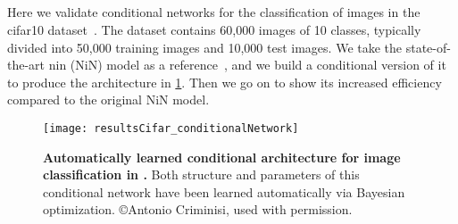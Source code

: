 \documentclass[thesis]{subfiles}
\begin{document}
	
	\subsection{}
	Here we validate conditional networks for the classification of images in the \gls{cifar10} dataset~\citep{CIFAR10}. 
	The dataset contains 60,000 images of 10 classes, typically divided into 50,000 training images and 10,000 test images. 
	We take the state-of-the-art \gls{nin} (NiN) model 
	as a reference~\citep{Lin2013NiN}, and we build a conditional version of it to produce the architecture in \cref{fig:Cifar_CondNet}. 
	Then we go on to show its increased efficiency compared to the original NiN model.
	
	\begin{figure}[tbp]
		\centerline{
			\texttt{[image: resultsCifar\_conditionalNetwork]}
		}
		\caption[Automatically-learned conditional architecture for ]{\textbf{Automatically learned conditional architecture for image classification in .} Both structure and parameters of this conditional network have been learned automatically via Bayesian optimization. \copyright Antonio Criminisi, used with permission.}
		\label{fig:Cifar_CondNet}
	\end{figure}
	
\end{document}
